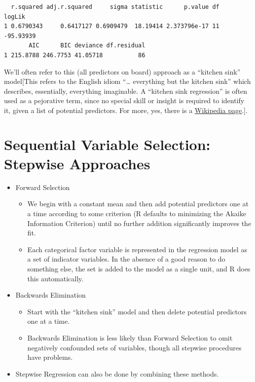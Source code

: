 \documentclass[]{book}
\providecommand{\tightlist}{%
  \setlength{\itemsep}{0pt}\setlength{\parskip}{0pt}}
\theoremstyle{definition}
\theoremstyle{definition}
\theoremstyle{definition}
\theoremstyle{remark}
\begin{document}
\begin{verbatim}
  r.squared adj.r.squared     sigma statistic      p.value df    logLik
1 0.6790343     0.6417127 0.6909479  18.19414 2.373796e-17 11 -95.93939
       AIC      BIC deviance df.residual
1 215.8788 246.7753 41.05718          86
\end{verbatim}

We'll often refer to this (all predictors on board) approach as a
``kitchen sink'' model{[}This refers to the English idiom ``\ldots{}
everything but the kitchen sink'' which describes, essentially,
everything imaginable. A ``kitchen sink regression'' is often used as a
pejorative term, since no special skill or insight is required to
identify it, given a list of potential predictors. For more, yes, there
is a
\href{https://en.wikipedia.org/wiki/Kitchen_sink_regression}{Wikipedia
page}.{]}.

\section{Sequential Variable Selection: Stepwise
Approaches}\label{sequential-variable-selection-stepwise-approaches}

\begin{itemize}
\tightlist
\item
  Forward Selection

  \begin{itemize}
  \tightlist
  \item
    We begin with a constant mean and then add potential predictors one
    at a time according to some criterion (R defaults to minimizing the
    Akaike Information Criterion) until no further addition
    significantly improves the fit.
  \item
    Each categorical factor variable is represented in the regression
    model as a set of indicator variables. In the absence of a good
    reason to do something else, the set is added to the model as a
    single unit, and R does this automatically.
  \end{itemize}
\item
  Backwards Elimination

  \begin{itemize}
  \tightlist
  \item
    Start with the ``kitchen sink'' model and then delete potential
    predictors one at a time.
  \item
    Backwards Elimination is less likely than Forward Selection to omit
    negatively confounded sets of variables, though all stepwise
    procedures have problems.
  \end{itemize}
\item
  Stepwise Regression can also be done by combining these methods.
\end{itemize}
\end{document}
